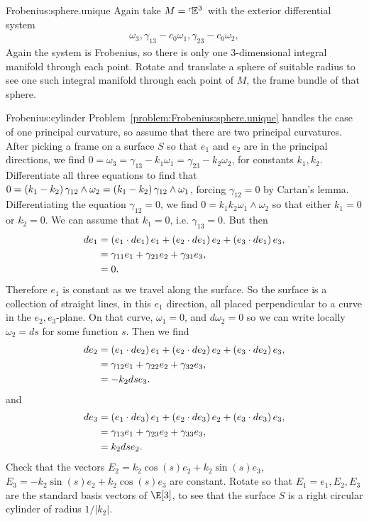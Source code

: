 \begin{answer}{Frobenius:sphere.unique}
Again take \(M=\left\ulcorner\!\mathbb{E}^{3}\right.\) with the exterior differential system
\begin{align*}
\omega_3, \gamma_{13} - c_0 \omega_1, \gamma_{23} - c_0 \omega_2,
\end{align*}
Again the system is Frobenius, so there is only one \(3\)-dimensional integral manifold through each point.
Rotate and translate a sphere of suitable radius to see one such integral manifold through each point of \(M\), the frame bundle of that sphere.
\end{answer}
\begin{answer}{Frobenius:cylinder}
Problem~\vref{problem:Frobenius:sphere.unique} handles the case of one principal curvature, so assume that there are two principal curvatures.
After picking a frame on a surface \(S\) so that \(e_1\) and \(e_2\) are in the principal directions, we find \(0=\omega_3=\gamma_{13}-k_1 \omega_1=\gamma_{23}-k_2 \omega_2\), for constants \(k_1, k_2\).
Differentiate all three equations to find that \(0=\left(k_1-k_2\right)\gamma_{12} \wedge \omega_2=\left(k_1-k_2\right) \gamma_{12} \wedge \omega_1\), forcing \(\gamma_{12}=0\) by Cartan's lemma.
Differentiating the equation \(\gamma_{12}=0\), we find \(0=k_1 k_2 \omega_1 \wedge \omega_2\) so that either \(k_1=0\) or \(k_2=0\).
We can assume that \(k_1=0\), i.e. \(\gamma_{13}=0\).
But then 
\begin{align*}
de_1
&=
\left(e_1 \cdot de_1\right) e_1 +
\left(e_2 \cdot de_1\right) e_2 +
\left(e_3 \cdot de_1\right) e_3,
\\
&=
\gamma_{11} e_1 +
\gamma_{21} e_2 +
\gamma_{31} e_3,
\\
&=
0.
\end{align*}
Therefore \(e_1\) is constant as we travel along the surface.
So the surface is a collection of straight lines, in this \(e_1\) direction, all placed perpendicular to a curve in the \(e_2, e_3\)-plane.
On that curve, \(\omega_1=0\), and \(d \omega_2=0\) so we can write locally \(\omega_2=ds\) for some function \(s\).
Then we find 
\begin{align*}
de_2
&=
\left(e_1 \cdot de_2\right) e_1 +
\left(e_2 \cdot de_2\right) e_2 +
\left(e_3 \cdot de_2\right) e_3,
\\
&=
\gamma_{12} e_1 +
\gamma_{22} e_2 +
\gamma_{32} e_3,
\\
&=
-k_2 ds e_3.
\end{align*}
and
\begin{align*}
de_3
&=
\left(e_1 \cdot de_3\right) e_1 +
\left(e_2 \cdot de_3\right) e_2 +
\left(e_3 \cdot de_3\right) e_3,
\\
&=
\gamma_{13} e_1 +
\gamma_{23} e_2 +
\gamma_{33} e_3,
\\
&=
k_2 ds e_2.
\end{align*}
Check that the vectors \(E_2 = k_2 \cos(s) e_2 + k_2 \sin(s) e_3\), \(E_3 = -k_2 \sin(s) e_2 + k_2 \cos(s) e_3\) are constant.
Rotate so that \(E_1=e_1, E_2, E_3\) are the standard basis vectors of \(\E[3]\), to see that the surface \(S\) is a right circular cylinder of radius \(1/\left|k_2\right|\).
\end{answer}
